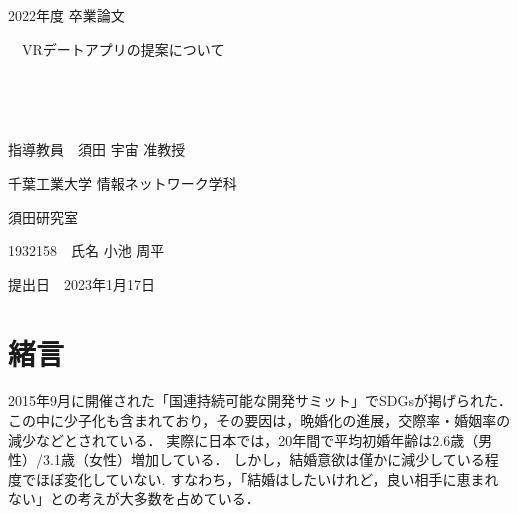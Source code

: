 \documentclass[12pt,a4j,titlepage]{ltjsarticle}
\begin{document}
\begin{titlepage}
  \begin{center}
  
    \vspace*{20truept}
    
    {\LARGE 2022年度 卒業論文} 
    
    \vspace*{75truept}
    
    {\Huge 　VRデートアプリの提案について}　%

    \vspace{10truept}

    {\Huge }　%

    \vspace{10truept}

    {\Huge }　%

    \vspace{85truept}
    
    {\LARGE 指導教員　須田 宇宙 准教授}
    
    \vspace{60truept}
    
    {\LARGE 千葉工業大学 情報ネットワーク学科}
    
    \vspace{15truept}
    
    {\LARGE 須田研究室}
    
    \vspace{70truept}
    
    {\LARGE 1932158　氏名 小池 周平 }　%

    \vspace{70truept}
    
  \end{center}
  \begin{flushright}

    {\LARGE 提出日　2023年1月17日}
  
  \end{flushright}
\end{titlepage}

\setcounter{tocdepth}{3}
\tableofcontents
\listoftables
\listoffigures
\clearpage

\section{緒言}\label{緒言}
2015年9月に開催された「国連持続可能な開発サミット」でSDGsが掲げられた．この中に少子化も含まれており，その要因は，晩婚化の進展\cite{sasaki2012}，交際率・婚姻率の減少\cite{naikakufu2019}などとされている．
実際に日本では，20年間で平均初婚年齢は2.6歳（男性）/3.1歳（女性）増加している．
しかし，結婚意欲は僅かに減少している程度でほぼ変化していない.
すなわち，「結婚はしたいけれど，良い相手に恵まれない」との考えが大多数を占めている\cite{naikakufu2019}．
\end{document}
